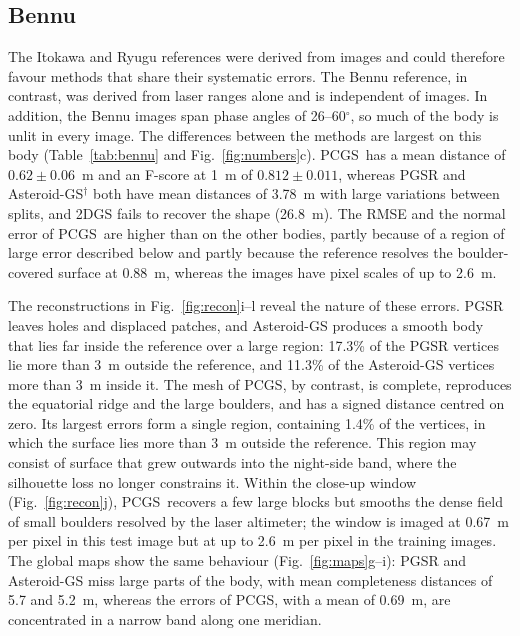 \documentclass[fleqn,usenatbib]{aa}
\newcommand{\pcgs}{PCGS}
\begin{document}
\subsection{Bennu}
\label{sec:bennu}

The Itokawa and Ryugu references were derived from images and could therefore favour methods that share their
systematic errors. The Bennu reference, in contrast, was derived from laser ranges alone and is independent of images.
In addition, the Bennu images span phase angles of 26--60$^\circ$, so much of the body is unlit in every image. The
differences between the methods are largest on this body (Table~\ref{tab:bennu} and Fig.~\ref{fig:numbers}c). \pcgs\ has a
mean distance of $0.62\pm0.06$~m and an F-score at 1~m of $0.812\pm0.011$, whereas PGSR and Asteroid-GS$^\dagger$ both
have mean distances of 3.78~m with large variations between splits, and 2DGS fails to recover the shape (26.8~m). The
RMSE and the normal error of \pcgs\ are higher than on the other bodies, partly because of a region of large error
described below and partly because the reference resolves the boulder-covered surface at 0.88~m, whereas the images
have pixel scales of up to 2.6~m.



The reconstructions in Fig.~\ref{fig:recon}i--l reveal the nature of these errors. PGSR leaves holes and displaced
patches, and Asteroid-GS produces a smooth body that lies far inside the reference over a large region: 17.3\% of the
PGSR vertices lie more than 3~m outside the reference, and 11.3\% of the Asteroid-GS vertices more than 3~m inside it.
The mesh of \pcgs, by contrast, is complete, reproduces the equatorial ridge and the large boulders, and has a signed
distance centred on zero. Its largest errors form a single region, containing 1.4\% of the vertices, in which the
surface lies more than 3~m outside the reference. This region may consist of surface that grew outwards into the night-side band, where the silhouette loss no longer constrains it. Within the close-up window (Fig.~\ref{fig:recon}j), \pcgs\
recovers a few large blocks but smooths the dense field of small boulders resolved by the laser altimeter; the window
is imaged at 0.67~m per pixel in this test image but at up to 2.6~m per pixel in the training images. The global
maps show the same behaviour (Fig.~\ref{fig:maps}g--i): PGSR and Asteroid-GS miss large parts of the body, with mean
completeness distances of 5.7 and 5.2~m, whereas the errors of \pcgs, with a mean of 0.69~m, are concentrated in a
narrow band along one meridian.
\end{document}
